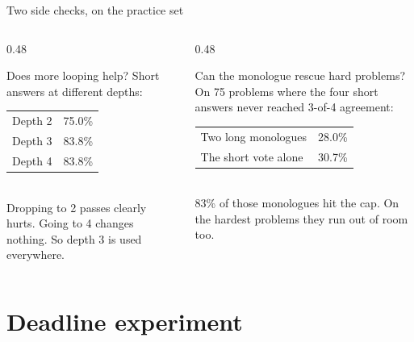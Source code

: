 \documentclass[aspectratio=169,11pt]{beamer}
\begin{document}
\begin{frame}{Two side checks, on the practice set}
  \small
  \begin{columns}[T,onlytextwidth]
    \begin{column}{0.48\textwidth}
      \begin{block}{Does more looping help?}
        Short answers at different depths:\\[0.4em]
        \begin{tabular}{@{}l r@{}}
          Depth 2 & 75.0\% \\
          Depth 3 & 83.8\% \\
          Depth 4 & 83.8\% \\
        \end{tabular}\\[0.4em]
        Dropping to 2 passes clearly hurts. Going to 4 changes nothing.
        So depth 3 is used everywhere.
      \end{block}
    \end{column}
    \begin{column}{0.48\textwidth}
      \begin{block}{Can the monologue rescue hard problems?}
        On 75 problems where the four short answers never reached 3-of-4 agreement:\\[0.4em]
        \begin{tabular}{@{}l r@{}}
          Two long monologues & 28.0\% \\
          The short vote alone & 30.7\% \\
        \end{tabular}\\[0.4em]
        83\% of those monologues hit the cap. On the hardest problems they run out of room too.
      \end{block}
    \end{column}
  \end{columns}
\end{frame}

\section{Deadline experiment}
\end{document}
